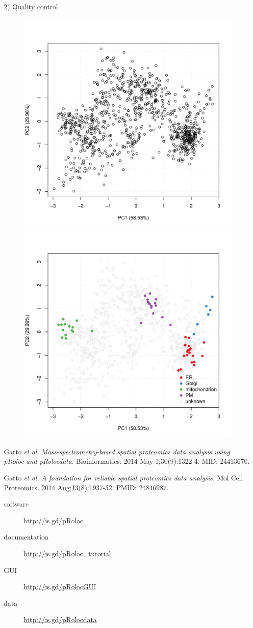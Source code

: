 \documentclass[final]{beamer}\usepackage[]{graphicx}\usepackage[]{color}
\newcommand{\challenge}[1]{
       \begin{tcolorbox}[notitle,boxrule=1pt,colback=blue!10,colframe=blue!25]
         {#1}
       \end{tcolorbox}
}
\begin{document}
\begin{frame}[fragile]
\begin{columns}
\begin{column}{.48\textwidth}
\begin{block}{2) Quality control}
      \end{block}
      \begin{figure}
        \centering
        \includegraphics[width=.49\linewidth]{./figures/pca1.pdf}
        \includegraphics[width=.49\linewidth]{./figures/pca2.pdf}
      \end{figure}


      \challenge{        
        Gatto \textit{et al.} \emph{Mass-spectrometry-based spatial
          proteomics data analysis using pRoloc and pRolocdata.}
        Bioinformatics. 2014 May 1;30(9):1322-4. MID: 24413670.

        \noindent Gatto \textit{et al.}  \emph{A foundation for
          reliable spatial proteomics data analysis.}  Mol Cell
        Proteomics. 2014 Aug;13(8):1937-52. PMID: 24846987.

        \vspace{2mm}
        \begin{description}
        \item[software] \url{http://is.gd/pRoloc}
        \item[documentation] \url{http://is.gd/pRoloc_tutorial}
        \item[GUI] \url{http://is.gd/pRolocGUI}
        \item[data] \url{http://is.gd/pRolocdata}  
        \end{description}
        \vspace{2mm}
    }


\end{column}
\end{columns}
\end{frame}
\end{document}
